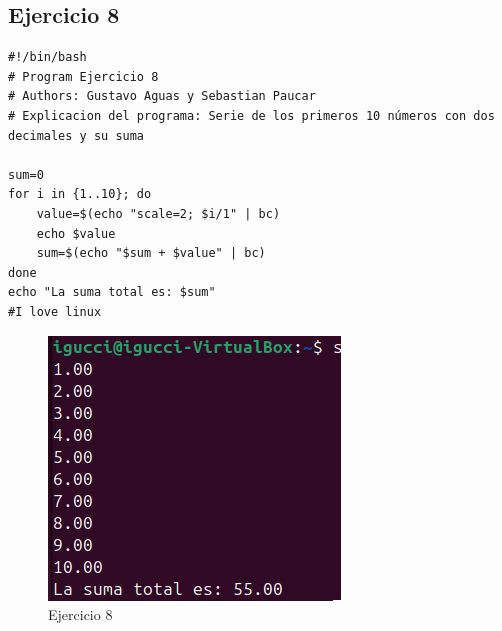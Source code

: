 \documentclass[11pt,twoside]{book}
\begin{document}
\subsection{Ejercicio 8}
\begin{lstlisting}
#!/bin/bash
# Program Ejercicio 8
# Authors: Gustavo Aguas y Sebastian Paucar
# Explicacion del programa: Serie de los primeros 10 números con dos decimales y su suma

sum=0
for i in {1..10}; do
    value=$(echo "scale=2; $i/1" | bc)
    echo $value
    sum=$(echo "$sum + $value" | bc)
done
echo "La suma total es: $sum"
#I love linux
\end{lstlisting}
\begin{figure}
    \centering
    \includegraphics[width=0.75\linewidth]{series/ej8.png}
    \caption{Ejercicio 8}
\end{figure}
\newpage
\end{document}
